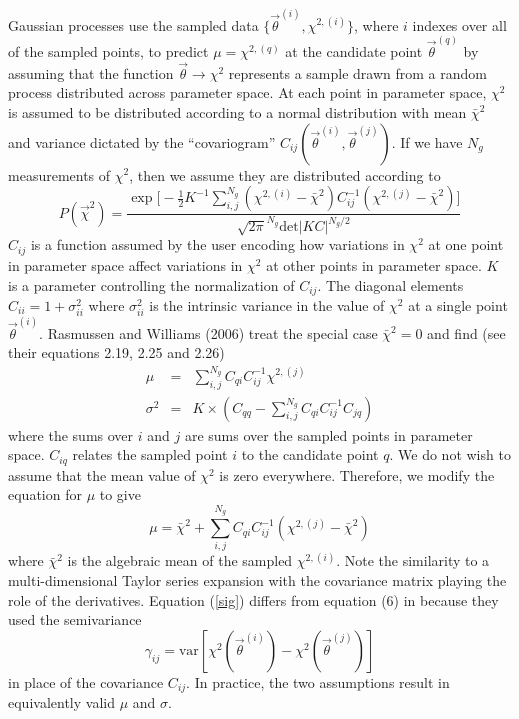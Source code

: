 \documentclass[useAMS,usenatbib]{aastex}
\begin{document}
Gaussian processes use the sampled data $\{\vec{\theta}^{(i)},\chi^{2,(i)}\}$, 
where $i$ indexes over all of the sampled points, to predict
$\mu=\chi^{2,(q)}$ at the candidate point 
$\vec{\theta}^{(q)}$ by assuming that the function
$\vec{\theta}\rightarrow\chi^2$ represents a sample drawn from a random process 
distributed
across parameter space.  At each point in parameter space, 
$\chi^2$ is assumed to be
distributed according to a normal distribution with mean 
$\bar{\chi}^2$
and variance dictated by the ``covariogram''
$C_{ij}(\vec{\theta}^{(i)},\vec{\theta}^{(j)})$.
If we have $N_g$ measurements of $\chi^2$, then we assume
they are distributed according to
\begin{equation}
\label{eqn:likelihood}
P(\vec{\chi}^2)=
\frac{\exp\bigg[-\frac{1}{2}K^{-1}\sum_{i,j}^{N_g}
(\chi^{2,(i)}-\bar{\chi}^2)C^{-1}_{ij}
(\chi^{2,(j)}-\bar{\chi}^2)\bigg]}{\sqrt{2\pi}^{N_g}\text{det}|KC|^{N_g/2}}
\end{equation}
$C_{ij}$ is a function assumed by the user encoding how variations in
$\chi^2$ at one point in parameter space affect variations in 
$\chi^2$ at other
points in parameter space.  $K$ is a parameter controlling the
normalization of $C_{ij}$.
The diagonal elements $C_{ii}=1+\sigma^2_{ii}$ where 
$\sigma^2_{ii}$ is the intrinsic variance in the value
of $\chi^2$ at a single point $\vec{\theta}^{(i)}$.  
Rasmussen and Williams (2006) treat 
the special case
$\bar{\chi}^2=0$ and find (see their equations 2.19, 2.25 and 2.26)
\begin{eqnarray}
\mu&=&\sum_{i,j}^{N_g} C_{qi}C^{-1}_{ij}\chi^{2,(j)}\nonumber\\
\sigma^2&=&K\times\left(C_{qq}-\sum_{i,j}^{N_g}C_{qi}C^{-1}_{ij}C_{jq}\right)\label{sig}
\end{eqnarray}
where the sums over $i$ and $j$ are sums over the sampled points 
in parameter space.  $C_{iq}$ relates the sampled point $i$ to the candidate
point $q$.
We do not wish to assume that the mean value of $\chi^2$ is zero everywhere.
Therefore, we modify the equation for $\mu$ to give
\begin{equation}
\label{mu}
\mu=\bar{\chi}^2+\sum_{i,j}^{N_g} C_{qi}C^{-1}_{ij}
(\chi^{2,(j)}-\bar{\chi}^2)
\end{equation}
where $\bar{\chi}^2$ is the algebraic mean of the 
sampled $\chi^{2,(i)}$.
Note the similarity to a multi-dimensional Taylor series expansion with the
covariance matrix playing the role of the derivatives.
Equation (\ref{sig}) differs from equation (6) in \cite{bryan} because
they used the semivariance
$$\gamma_{ij}=\text{var}[\chi^2(\vec{\theta}^{(i)})
-\chi^2(\vec{\theta}^{(j)})]$$
in place of the covariance $C_{ij}$.  In practice, the two assumptions result in
equivalently valid $\mu$ and $\sigma$.
\end{document}

